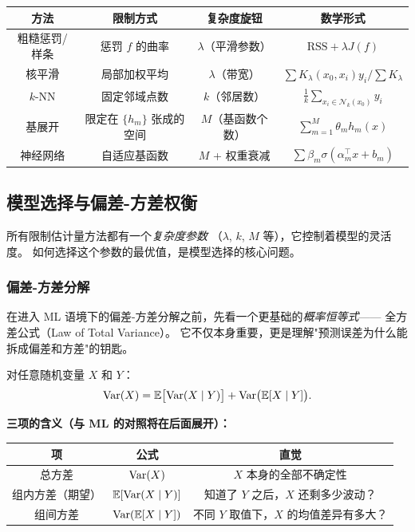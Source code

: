 \begin{center}
\renewcommand{\arraystretch}{1.4}
\begin{tabular}{c|c|c|c}
\toprule
\textbf{方法} & \textbf{限制方式} & \textbf{复杂度旋钮} & \textbf{数学形式} \\
\midrule
粗糙惩罚/样条 & 惩罚 $f$ 的曲率 & $\lambda$（平滑参数） & $\mathrm{RSS} + \lambda J(f)$ \\
核平滑 & 局部加权平均 & $\lambda$（带宽） & $\sum K_\lambda(x_0, x_i) y_i / \sum K_\lambda$ \\
$k$-NN & 固定邻域点数 & $k$（邻居数） & $\frac{1}{k}\sum_{x_i \in \mathcal{N}_k(x_0)} y_i$ \\
基展开 & 限定在 $\{h_m\}$ 张成的空间 & $M$（基函数个数） & $\sum_{m=1}^M \theta_m h_m(x)$ \\
神经网络 & 自适应基函数 & $M$ + 权重衰减 & $\sum \beta_m \sigma(\alpha_m^\top x + b_m)$ \\
\bottomrule
\end{tabular}
\end{center}

\subsection{模型选择与偏差-方差权衡}

所有限制估计量方法都有一个\emph{复杂度参数}
（$\lambda$, $k$, $M$ 等），它控制着模型的灵活度。
如何选择这个参数的最优值，是模型选择的核心问题。

\subsubsection{偏差-方差分解}

在进入 ML 语境下的偏差-方差分解之前，先看一个更基础的\emph{概率恒等式}——
全方差公式（Law of Total Variance）。
它不仅本身重要，更是理解"预测误差为什么能拆成偏差和方差"的钥匙。

\begin{theorem}\label{thm:total-variance}
对任意随机变量 $X$ 和 $Y$：
\begin{equation}\label{eq:total-variance}
    \mathrm{Var}(X) = \mathbb{E}\big[\mathrm{Var}(X \mid Y)\big] + \mathrm{Var}\big(\mathbb{E}[X \mid Y]\big).
\end{equation}
\end{theorem}

\textbf{三项的含义（与 ML 的对照将在后面展开）：}

\begin{center}
\renewcommand{\arraystretch}{1.6}
\begin{tabular}{c|c|c}
\toprule
\textbf{项} & \textbf{公式} & \textbf{直觉} \\
\midrule
总方差 & $\mathrm{Var}(X)$ & $X$ 本身的全部不确定性 \\
组内方差（期望） & $\mathbb{E}[\mathrm{Var}(X \mid Y)]$ & 知道了 $Y$ 之后，$X$ 还剩多少波动？\\
组间方差 & $\mathrm{Var}(\mathbb{E}[X \mid Y])$ & 不同 $Y$ 取值下，$X$ 的均值差异有多大？\\
\bottomrule
\end{tabular}
\end{center}

